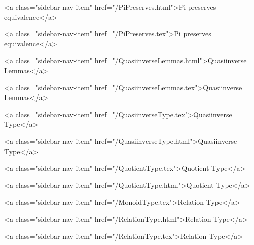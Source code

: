       
    
      
        
          <a class="sidebar-nav-item" href="/PiPreserves.html">Pi preserves equivalence</a>
        
      
    
      
        
          <a class="sidebar-nav-item" href="/PiPreserves.tex">Pi preserves equivalence</a>
        
      
    
      
        
          <a class="sidebar-nav-item" href="/QuasiinverseLemmas.html">Quasiinverse Lemmas</a>
        
      
    
      
        
          <a class="sidebar-nav-item" href="/QuasiinverseLemmas.tex">Quasiinverse Lemmas</a>
        
      
    
      
        
          <a class="sidebar-nav-item" href="/QuasiinverseType.tex">Quasiinverse Type</a>
        
      
    
      
        
          <a class="sidebar-nav-item" href="/QuasiinverseType.html">Quasiinverse Type</a>
        
      
    
      
        
          <a class="sidebar-nav-item" href="/QuotientType.tex">Quotient Type</a>
        
      
    
      
        
          <a class="sidebar-nav-item" href="/QuotientType.html">Quotient Type</a>
        
      
    
      
        
          <a class="sidebar-nav-item" href="/MonoidType.tex">Relation Type</a>
        
      
    
      
        
          <a class="sidebar-nav-item" href="/RelationType.html">Relation Type</a>
        
      
    
      
        
          <a class="sidebar-nav-item" href="/RelationType.tex">Relation Type</a>
        
